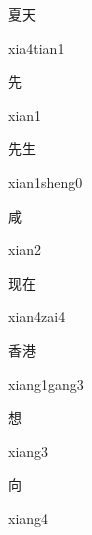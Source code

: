 \begin{multicols*}{2}
\begin{verbete}{夏天}
\begin{pronuncia}{xia4tian1}
\end{pronuncia}
\end{verbete}

\begin{verbete}[xian1]{先}
\begin{pronuncia}{xian1}
\end{pronuncia}
\end{verbete}

\begin{verbete}{先生}
\begin{pronuncia}{xian1sheng0}
\end{pronuncia}
\end{verbete}

\begin{verbete}[xian2]{咸}
\begin{pronuncia}{xian2}
\end{pronuncia}
\end{verbete}

\begin{verbete}{现在}
\begin{pronuncia}{xian4zai4}
\end{pronuncia}
\end{verbete}

\begin{verbete}{香港}
\begin{pronuncia}{xiang1gang3}
\end{pronuncia}
\end{verbete}

\begin{verbete}[xiang3]{想}
\begin{pronuncia}{xiang3}
\end{pronuncia}
\end{verbete}

\begin{verbete}[xiang4]{向}
\begin{pronuncia}{xiang4}
\end{pronuncia}
\end{verbete}


\end{multicols*}
